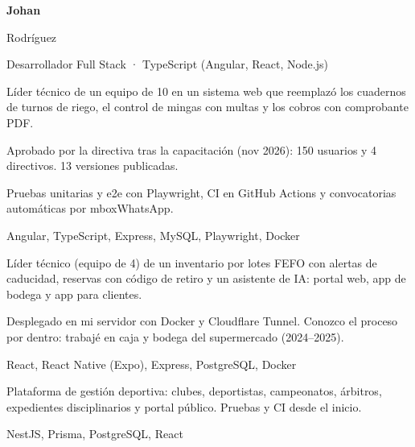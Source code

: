 \documentclass[9pt]{extarticle}
\begin{document}
\hspace{1.2cm}%
\begin{minipage}[t]{\anchoPrincipal}
\vspace{0pt}
\color{tinta}
{\bfseries\fontsize{34}{36}\selectfont Johan\par Rodríguez\par}
\vspace{6pt}
{\color{suave}\fontsize{11.5}{14}\selectfont Desarrollador Full Stack · TypeScript (Angular, React, Node.js)\par}

\begin{vinetas}
  \item Líder técnico de un equipo de 10 en un sistema web que reemplazó los cuadernos de turnos de riego, el control de mingas con multas y los cobros con comprobante PDF.
  \item Aprobado por la directiva tras la capacitación (nov 2026): 150 usuarios y 4 directivos. 13 versiones publicadas.
  \item Pruebas unitarias y e2e con Playwright, CI en GitHub Actions y convocatorias automáticas por mbox{WhatsApp}.
\end{vinetas}
{\small\color{suave}Angular, TypeScript, Express, MySQL, Playwright, Docker}\par
\vspace{6pt}
\begin{vinetas}
  \item Líder técnico (equipo de 4) de un inventario por lotes FEFO con alertas de caducidad, reservas con código de retiro y un asistente de IA: portal web, app de bodega y app para clientes.
  \item Desplegado en mi servidor con Docker y Cloudflare Tunnel. Conozco el proceso por dentro: trabajé en caja y bodega del supermercado (2024–2025).
\end{vinetas}
{\small\color{suave}React, React Native (Expo), Express, PostgreSQL, Docker}\par
\vspace{6pt}
\begin{vinetas}
  \item Plataforma de gestión deportiva: clubes, deportistas, campeonatos, árbitros, expedientes disciplinarios y portal público. Pruebas y CI desde el inicio.
\end{vinetas}
{\small\color{suave}NestJS, Prisma, PostgreSQL, React}\par


\end{minipage}
\end{document}
